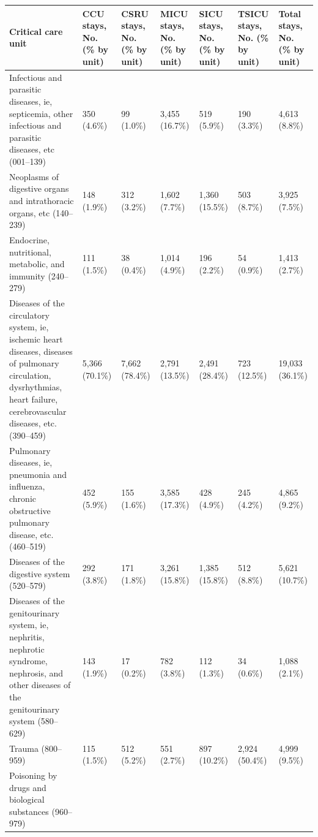 \documentclass[english]{article}
\begin{document}

\begin{center}
\begin{table}
\begin{tabular}{|p{4.2cm}|p{1.3cm}|p{1.3cm}|p{1.3cm}|p{1.3cm}|p{1.3cm}|p{1.3cm}|}
    \hline
    Critical care unit & 
    CCU stays, No. (\% by unit) & 
    CSRU stays, No. (\% by unit) &    
    MICU stays, No. (\% by unit) & 
    SICU stays, No. (\% by unit) & 
    TSICU stays, No. (\% by unit) & 
    Total stays, No. (\% by unit) \\ 
    \hline
    Infectious and parasitic diseases, ie, septicemia, other infectious and parasitic diseases, etc (001–139)
    & 350 (4.6\%) & 99 (1.0\%) & 3,455 (16.7\%) & 519 (5.9\%) & 190 (3.3\%) & 4,613 (8.8\%) \\ 
    \hline
    Neoplasms of digestive organs and intrathoracic organs, etc (140–239)
    & 148 (1.9\%) & 312 (3.2\%) & 1,602 (7.7\%) & 1,360 (15.5\%) & 503 (8.7\%) & 3,925 (7.5\%) \\ 
    \hline
    Endocrine, nutritional, metabolic, and immunity (240–279) 
    & 111 (1.5\%) & 38 (0.4\%) & 1,014 (4.9\%) & 196 (2.2\%) & 54 (0.9\%) & 1,413 (2.7\%) \\ 
    \hline
    Diseases of the circulatory system, ie, ischemic heart diseases, diseases of pulmonary circulation, dysrhythmias, heart failure, cerebrovascular diseases, etc. (390–459) 
    & 5,366 (70.1\%) & 7,662 (78.4\%) & 2,791 (13.5\%) & 2,491 (28.4\%) & 723 (12.5\%) & 19,033 (36.1\%) \\ 
    \hline
    Pulmonary diseases, ie, pneumonia and influenza, chronic obstructive pulmonary disease, etc. (460–519) 
    & 452 (5.9\%) & 155 (1.6\%) & 3,585 (17.3\%) & 428 (4.9\%) & 245 (4.2\%) & 4,865 (9.2\%) \\ 
    \hline
    Diseases of the digestive system (520–579) 
    & 292 (3.8\%) & 171 (1.8\%) & 3,261 (15.8\%) & 1,385 (15.8\%) & 512 (8.8\%) & 5,621 (10.7\%) \\ 
    \hline
    Diseases of the genitourinary system, ie, nephritis, nephrotic syndrome, nephrosis, and other diseases of the genitourinary system (580–629) 
    & 143 (1.9\%) & 17 (0.2\%) & 782 (3.8\%) & 112 (1.3\%) & 34 (0.6\%) & 1,088 (2.1\%) \\ 
    \hline
    Trauma (800–959) 
    & 115 (1.5\%) & 512 (5.2\%) & 551 (2.7\%) & 897 (10.2\%) & 2,924 (50.4\%) & 4,999 (9.5\%) \\ 
    \hline
    Poisoning by drugs and biological substances (960–979) 

\end{tabular}
\end{table}
\end{center}
\end{document}
